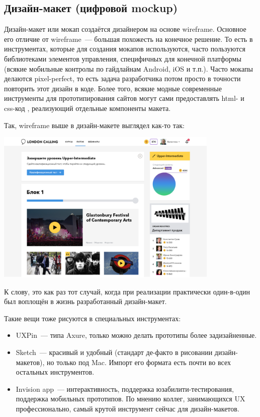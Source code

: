\documentclass{../../text-style}
\begin{document}
\subsection{Дизайн-макет (цифровой mockup)}

Дизайн-макет или мокап создаётся дизайнером на основе wireframe. Основное его отличие от wireframe~--- большая похожесть на конечное решение. То есть в инструментах, которые для создания мокапов используются, часто пользуются библиотеками элементов управления, специфичных для конечной платформы (всякие мобильные контролы по гайдлайнам Android, iOS и т.п.). Часто мокапы делаются pixel-perfect, то есть задача разработчика потом просто в точности повторить этот дизайн в коде. Более того, всякие модные современные инструменты для прототипирования сайтов могут сами предоставлять html- и css-код , реализующий отдельные компоненты макета.

Так, wireframe выше в дизайн-макете выглядел как-то так:

\begin{center}
    \includegraphics[width=0.8\textwidth]{designLayout.png}
\end{center}

К слову, это как раз тот случай, когда при реализации практически один-в-один был воплощён в жизнь разработанный дизайн-макет.

Такие вещи тоже рисуются в специальных инструментах:

\begin{itemize}
    \item UXPin~---  типа Axure, только можно делать прототипы более задизайненные.
    \item Sketch~--- красивый и удобный (стандарт де-факто в рисовании дизайн-макетов), но только под Mac. Импорт его формата есть почти во всех остальных инструментов.
    \item Invision app~--- интерактивность, поддержка юзабилити-тестирования, поддержка мобильных прототипов. По мнению коллег, занимающихся UX профессионально, самый крутой инструмент сейчас для дизайн-макетов.
\end{itemize}
\end{document}

